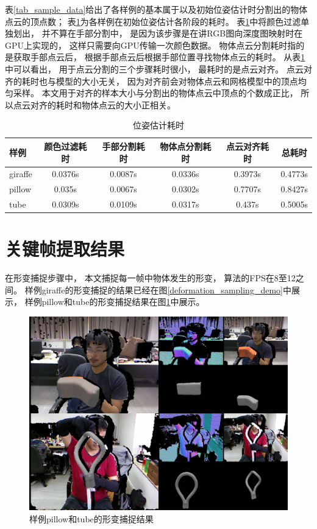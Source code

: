 表\ref{tab_sample_data}给出了各样例的基本属于以及初始位姿估计时分割出的物体点云的顶点数；
表\ref{tab_est_pose_time}为各样例在初始位姿估计各阶段的耗时。
表\ref{tab_est_pose_time}中将颜色过滤单独划出，
并不算在手部分割中，
是因为该步骤是在讲RGB图向深度图映射时在GPU上实现的，
这样只需要向GPU传输一次颜色数据。
物体点云分割耗时指的是获取手部点云后，
根据手部点云后根据手部位置寻找物体点云的耗时。
从表\ref{tab_est_pose_time}中可以看出，
用于点云分割的三个步骤耗时很小，
最耗时的是点云对齐。
点云对齐的耗时也与模型的大小无关，
因为对齐前会对物体点云和网格模型中的顶点均匀采样。
本文用于对齐的样本大小与分割出的物体点云中顶点的个数成正比，
所以点云对齐的耗时和物体点云的大小正相关。
\begin{table}
    \caption{位姿估计耗时}
    \label{tab_est_pose_time} 
    \centering
    \begin{tabular}[t]{|l|c|c|c|c|c|}
        \hline
        样例        &   颜色过滤耗时   & 手部分割耗时    &   物体点分割耗时    & 点云对齐耗时    &   总耗时\\
        \hline
        giraffe    &    0.0376s       &  0.0087s       &    0.0336s         &   0.3973s     &   0.4773s\\
        \hline
        pillow     &    0.035s        &  0.0067s       &    0.0302s         &   0.7707s     &   0.8427s\\
        \hline
        tube       &    0.0309s       &  0.0109s       &    0.0317s         &   0.437s      &   0.5005s\\             
        \hline
    \end{tabular}
\end{table}
\section{关键帧提取结果}\label{sec_keyframe_res}
在形变捕捉步骤中，
本文捕捉每一帧中物体发生的形变，
算法的FPS在8至12之间。
样例giraffe的形变捕捉的结果已经在图\ref{deformation_sampling_demo}中展示，
样例pillow和tube的形变捕捉结果在图\ref{ds_p_t}中展示。
\begin{figure}
    \centering
    \includegraphics[width = \textwidth]{./Pictures/ds_p_t.png}
    \caption{样例pillow和tube的形变捕捉结果}
    \label{ds_p_t}
\end{figure}

